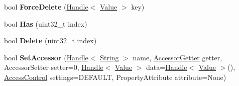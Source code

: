 \begin{DoxyCompactItemize}
\item 
\hypertarget{classv8_1_1_object_a8e7f3b8b70eb17bcb5cc087d5b6746d6}{}bool {\bfseries Force\+Delete} (\hyperlink{classv8_1_1_handle}{Handle}$<$ \hyperlink{classv8_1_1_value}{Value} $>$ key)\label{classv8_1_1_object_a8e7f3b8b70eb17bcb5cc087d5b6746d6}

\item 
\hypertarget{classv8_1_1_object_ac547af2f2d256d96991ff20159a44bfd}{}bool {\bfseries Has} (uint32\+\_\+t index)\label{classv8_1_1_object_ac547af2f2d256d96991ff20159a44bfd}

\item 
\hypertarget{classv8_1_1_object_a63f88a22cb5d994eedc1efc79520bc42}{}bool {\bfseries Delete} (uint32\+\_\+t index)\label{classv8_1_1_object_a63f88a22cb5d994eedc1efc79520bc42}

\item 
\hypertarget{classv8_1_1_object_a402529c356944a2ba641883983844fdd}{}bool {\bfseries Set\+Accessor} (\hyperlink{classv8_1_1_handle}{Handle}$<$ \hyperlink{classv8_1_1_string}{String} $>$ name, \hyperlink{namespacev8_a3016fe071826349d1370a700e71be094}{Accessor\+Getter} getter, Accessor\+Setter setter=0, \hyperlink{classv8_1_1_handle}{Handle}$<$ \hyperlink{classv8_1_1_value}{Value} $>$ data=\hyperlink{classv8_1_1_handle}{Handle}$<$ \hyperlink{classv8_1_1_value}{Value} $>$(), \hyperlink{namespacev8_a31d8355cb043d7d2dda3f4a52760b64e}{Access\+Control} settings=D\+E\+F\+A\+U\+L\+T, Property\+Attribute attribute=None)\label{classv8_1_1_object_a402529c356944a2ba641883983844fdd}


\end{DoxyCompactItemize}

